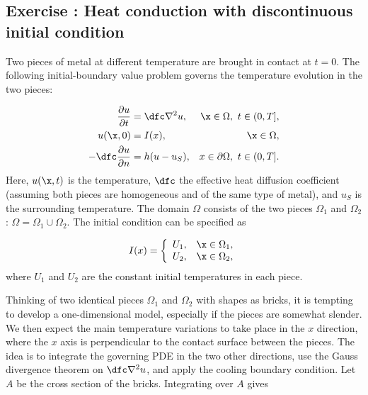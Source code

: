 \documentclass[graybox,envcountchap,sectrefs,final]{svmonodo}
\newcounter{doconce:movie:counter}
\newenvironment{doconceexercise}{}{}
\newcounter{doconceexercisecounter}
\begin{document}
\begin{doconceexercise}

\subsection*{Exercise \thedoconceexercisecounter: Heat conduction with discontinuous initial condition}

\label{scale:exer:twometal}

Two pieces of metal at different temperature are brought in contact
at $t=0$. The following initial-boundary value problem governs the
temperature evolution in the two pieces:

\begin{align}
\frac{\partial u}{\partial t} &= \dfc\nabla^2 u,\ & \x\in\Omega,\ t\in (0,T],\\ 
u(\x,0)&=I(x), & \x\in \Omega,\\ 
-\dfc\frac{\partial u}{\partial n} &= h(u-u_S),
& x\in\partial\Omega,\ t\in (0,T].
\end{align}
Here, $u(\x,t)$ is the temperature, $\dfc$ the effective heat diffusion
coefficient (assuming both pieces are homogeneous and of the same type of
metal), and $u_S$ is the surrounding temperature.
The domain $\Omega$ consists of the two pieces $\Omega_1$ and $\Omega_2$:
$\Omega = \Omega_1\cup\Omega_2$. The initial condition can be specified as

\[ I(x) = \left\lbrace\begin{array}{ll}
U_1, & \x\in\Omega_1,\\ 
U_2, & \x\in\Omega_2,
\end{array}\right.
\]
where $U_1$ and $U_2$ are the constant initial temperatures in each piece.

Thinking of two identical pieces $\Omega_1$ and $\Omega_2$ with shapes
as bricks, it is tempting to develop a one-dimensional model,
especially if the pieces are somewhat slender. We then expect the main
temperature variations to take place in the $x$ direction, where the
$x$ axis is perpendicular to the contact surface between the pieces.
The idea is to integrate the governing PDE in the two other
directions, use the Gauss divergence theorem on $\dfc\nabla^2u$, and
apply the cooling boundary condition. Let $A$ be the cross section of
the bricks. Integrating over $A$ gives


\end{doconceexercise}
\end{document}
